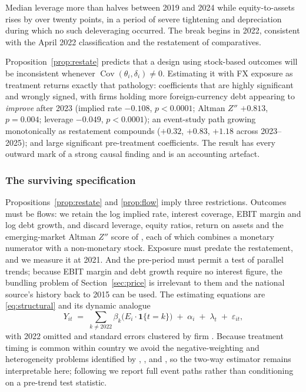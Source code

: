 \documentclass[review,12pt,authoryear]{elsarticle}
\theoremstyle{plain}
\theoremstyle{definition}
\newcommand{\Cov}{\operatorname{Cov}}
\newcommand{\one}{\mathbf{1}}
\begin{document}
Median leverage more than halves between 2019 and 2024 while equity-to-assets
rises by over twenty points, in a period of severe tightening and depreciation
during which no such deleveraging occurred. The break begins in 2022, consistent
with the April 2022 classification and the restatement of comparatives.

Proposition~\ref{prop:restate} predicts that a design using stock-based outcomes
will be inconsistent whenever $\Cov(\theta_i,\delta_i)\neq0$. Estimating it with
FX exposure as treatment returns exactly that pathology: coefficients that are
highly significant and wrongly signed, with firms holding more foreign-currency
debt appearing to \emph{improve} after 2023 (implied rate $-0.108$, $p<0.0001$;
Altman $Z''$ \citep{altman2005} $+0.813$, $p=0.004$; leverage $-0.049$,
$p<0.0001$); an event-study
path growing monotonically as restatement compounds ($+0.32$, $+0.83$, $+1.18$
across 2023--2025); and large significant pre-treatment coefficients. The result
has every outward mark of a strong causal finding and is an accounting artefact.

\subsubsection{The surviving specification}

Propositions~\ref{prop:restate} and \ref{prop:flow} imply three restrictions.
Outcomes must be flows: we retain the log implied rate, interest coverage, EBIT
margin and log debt growth, and discard leverage, equity ratios, return on
assets and the emerging-market Altman $Z''$ score of \citet{altman2005}, each of
which combines a monetary numerator with a non-monetary stock. Exposure must predate the restatement, and we
measure it at 2021. And the pre-period must permit a test of parallel trends;
because EBIT margin and debt growth require no interest figure, the bundling
problem of Section~\ref{sec:price} is irrelevant to them and the national
source's history back to 2015 can be used. The estimating equations are
\eqref{eq:structural} and its dynamic analogue
\begin{equation}
Y_{it} \;=\; \sum_{k\neq 2022}\beta_k\bigl(E_i\cdot\one\{t=k\}\bigr)
\;+\;\alpha_i\;+\;\lambda_t\;+\;\varepsilon_{it},
\label{eq:event}
\end{equation}
with 2022 omitted and standard errors clustered by firm \citep{petersen2009}.
Because treatment timing is common within country we avoid the
negative-weighting and heterogeneity problems identified by
\citet{goodmanbacon2021}, \citet{dechaisemartin2020}, \citet{callaway2021} and
\citet{sun2021}, so the two-way estimator remains interpretable here; following
\citet{roth2022} we report full event paths rather than conditioning on a
pre-trend test statistic.
\end{document}
